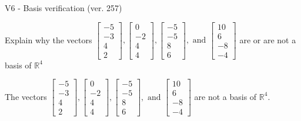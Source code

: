 \begin{exercise}
  \begin{exerciseTitle}V6 - Basis verification (ver. 257)\end{exerciseTitle}
  \begin{exerciseStatement}
    Explain why the vectors \(\left[\begin{array}{r}
-5 \\
-3 \\
4 \\
2
\end{array}\right] , \left[\begin{array}{r}
0 \\
-2 \\
4 \\
4
\end{array}\right] , \left[\begin{array}{r}
-5 \\
-5 \\
8 \\
6
\end{array}\right] , \text{ and } \left[\begin{array}{r}
10 \\
6 \\
-8 \\
-4
\end{array}\right]\) are or are not a basis of \(\mathbb{R}^4\)	


  \end{exerciseStatement}
  \begin{exerciseAnswer}
   The vectors \(\left[\begin{array}{r}
-5 \\
-3 \\
4 \\
2
\end{array}\right] , \left[\begin{array}{r}
0 \\
-2 \\
4 \\
4
\end{array}\right] , \left[\begin{array}{r}
-5 \\
-5 \\
8 \\
6
\end{array}\right] , \text{ and } \left[\begin{array}{r}
10 \\
6 \\
-8 \\
-4
\end{array}\right]\) 
  	 are not  a basis of \(\mathbb{R}^4\).
  


  \end{exerciseAnswer}
\end{exercise}